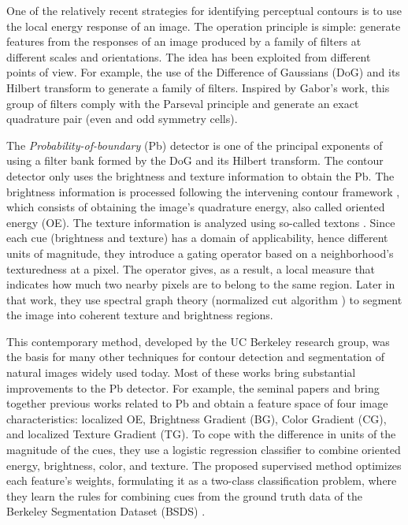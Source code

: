 \documentclass[journal]{IEEEtran}
\begin{document}
One of the relatively recent strategies for identifying perceptual contours is to use the local energy response of an image. The operation principle is simple: generate features from the responses of an image produced by a family of filters at different scales and orientations. The idea has been exploited from different points of view. For example, the use of the Difference of Gaussians (DoG) and its Hilbert transform \cite{Morrone.Owens:PR:1987, Morrone.Burr.ea:RSL:1988} to generate a family of filters. Inspired by Gabor's work, this group of filters comply with the Parseval principle and generate an exact quadrature pair (even and odd symmetry cells). 

The \textit{Probability-of-boundary} (Pb) detector \cite{Malik.Belongie.ea:IJCV:2001} is one of the principal exponents of using a filter bank formed by the DoG and its Hilbert transform. The contour detector only uses the brightness and texture information to obtain the Pb. The brightness information is processed following the intervening contour framework \cite{Leung.Malik:ECCV:1998}, which consists of obtaining the image's quadrature energy, also called oriented energy (OE). The texture information is analyzed using so-called textons \cite{Malik.Belongie.ea:ICCV:1999}. Since each cue (brightness and texture) has a domain of applicability, hence different units of magnitude, they introduce a gating operator based on a neighborhood's texturedness at a pixel. The operator gives, as a result, a local measure that indicates how much two nearby pixels are to belong to the same region. Later in that work, they use spectral graph theory (normalized cut algorithm \cite{JianboShi.Malik:PAMI:2000}) to segment the image into coherent texture and brightness regions. 

This contemporary method, developed by the UC Berkeley research group, was the basis for many other techniques for contour detection and segmentation of natural images widely used today. Most of these works bring substantial improvements to the Pb detector. For example, the seminal papers \cite{Martin.Fowlkes.ea:NIPS:2002} and \cite{Martin.Fowlkes.ea:PAMI:2004} bring together previous works related to Pb and obtain a feature space of four image characteristics: localized OE, Brightness Gradient (BG), Color Gradient (CG), and localized Texture Gradient (TG). To cope with the difference in units of the magnitude of the cues, they use a logistic regression classifier to combine oriented energy, brightness, color, and texture. The proposed supervised method optimizes each feature's weights, formulating it as a two-class classification problem, where they learn the rules for combining cues from the ground truth data of the Berkeley Segmentation Dataset (BSDS) \cite{Martin.Fowlkes.ea:ICCV:2001}.
\end{document}

